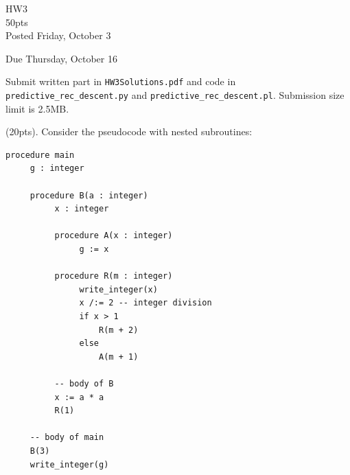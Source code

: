 \documentclass[11pt]{amsart}
\begin{document}
\begin{center}
\huge HW3 \\
50pts \\

\Large Posted Friday, October 3

\Large Due Thursday, October 16

\normalsize
\end{center}

Submit written part in \texttt{HW3Solutions.pdf} and code in \texttt{predictive\_rec\_descent.py} and \texttt{predictive\_rec\_descent.pl}. Submission size limit is 2.5MB. 

\vspace{0.2in}

 (20pts). Consider the pseudocode with nested subroutines:


\begin{verbatim}
procedure main
     g : integer
       
     procedure B(a : integer) 
          x : integer

          procedure A(x : integer)
               g := x
                  
          procedure R(m : integer)
               write_integer(x)
               x /:= 2 -- integer division 
               if x > 1
                   R(m + 2)
               else
                   A(m + 1)
              
          -- body of B
          x := a * a
          R(1)
          
     -- body of main
     B(3)
     write_integer(g)   
                      
\end{verbatim}
\end{document}
